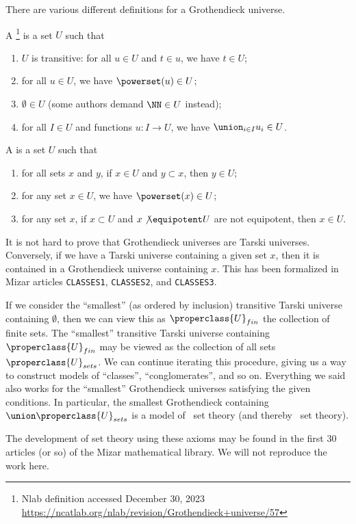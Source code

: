 \begin{node}\label{tg-0001}%
There are various different definitions for a Grothendieck universe.
\begin{definition}\label{set:tg-0000}%
A \footnote{Nlab definition accessed
December 30, 2023 \url{https://ncatlab.org/nlab/revision/Grothendieck+universe/57}} is a set $U$ such that
\begin{enumerate}
\item $U$ is transitive: for all $u\in U$ and $t\in u$, we have $t\in U$;
\item for all $u\in U$, we have $\powerset(u)\in U$;
\item $\emptyset\in U$ (some authors demand $\NN\in U$ instead);
\item for all $I\in U$ and functions $u\colon I\to U$, we have
  $\union_{i\in I}u_{i}\in U$.
\end{enumerate}
\end{definition}
\begin{definition}
A  is a set $U$ such that
\begin{enumerate}
\item for all sets $x$ and $y$, if $x\in U$ and $y\subset x$, then $y\in U$;
\item for any set $x\in U$, we have $\powerset(x)\in U$;
\item for any set $x$, if $x\subset U$ and $x\not\equipotent U$ are not equipotent, then $x\in U$.
\end{enumerate}
\begin{node}[Remarks]\label{tg-0002}%
It is not hard to prove that Grothendieck universes are Tarski universes.
Conversely, if we have a Tarski universe containing a given set $x$,
then it is contained in a Grothendieck universe containing $x$. This has
been formalized in Mizar articles \texttt{CLASSES1}, \texttt{CLASSES2},
and \texttt{CLASSES3}.

If we consider the ``smallest'' (as ordered by inclusion) transitive
Tarski universe containing $\emptyset$, then we can view this as
$\properclass{U}_{fin}$ the collection of finite sets. The ``smallest''
transitive Tarski universe containing $\properclass{U}_{fin}$ may be
viewed as the collection of all sets $\properclass{U}_{sets}$. We can
continue iterating this procedure, giving us a way to construct
models of ``classes'', ``conglomerates'', and so on. Everything we said
also works for the ``smallest'' Grothendieck universes satisfying the
given conditions. In particular, the smallest Grothendieck containing $\union\properclass{U}_{sets}$
is a model of \MK\ set theory (and thereby \NBG\ set theory).
\end{node}
\end{definition}
\end{node}

\begin{node}\label{tg-000A}%
The development of set theory using these axioms may be found in the
first 30 articles (or so) of the Mizar mathematical library. We will not
reproduce the work here.
\end{node}
